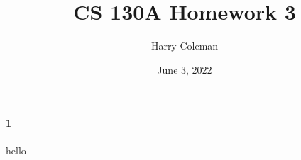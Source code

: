 \documentclass[12pt]{article}
\renewcommand{\maketitle}{\thispagestyle{title}}
\newcommand{\pnum}[1]{\paragraph{#1}}
\theoremstyle{definition}
\newcommand{\<}{\langle}
\renewcommand{\>}{\rangle}
\begin{document}
\title{CS 130A Homework 3}
\author{Harry Coleman}
\date{June 3, 2022}
\maketitle

\pnum{1}
hello
\end{document}
